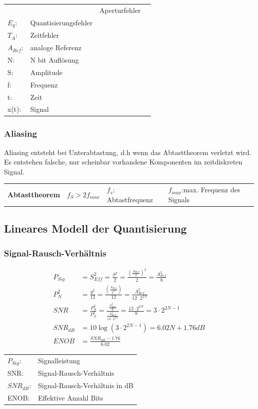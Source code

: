 \begin{longtable}[c]{ l  l l l }
&
\begin{minipage}{5cm}
\begin{tabular}{ll}
$E_{A}$: &Aperturfehler\\
$E_{q}$:&Quantisierungsfehler\\
$T_{A}$:&Zeitfehler\\
$A_{Ref}$:&analoge Referenz\\
N:& N bit Auflösung\\
S: &Amplitude\\
f: &Frequenz\\
t: &Zeit\\
x(t):&Signal
\end{tabular}


\end{minipage}
\\
\end{longtable}


\subsubsection{Aliasing}
Aliasing entsteht bei Unterabtastung, d.h wenn das Abtasttheorem verletzt wird.
Es entstehen falsche, nur scheinbar vorhandene Komponenten im zeitdiskreten
Signal.

\begin{tabular}{llll}
	\textbf{Abtasttheorem}
	& $f_{S}>2f_{max}$
	& $f_{s}$: Abtastfrequenz
	&$f_{max}$:max. Frequenz des Signals
\end{tabular}

\subsection{Lineares Modell der Quantisierung}
\subsubsection{Signal-Rausch-Verhältnis}
\begin{multicols}{2}
\begin{align*}
P_{Sig} &= S^2_{Eff} = \frac{S^2}{2} = \frac{(\frac{A_{Ref}}{2})^2}{2} = \frac{A^2_{Ref}}{8}\\
P^2_{N} &= \frac{q^2}{12} = \frac{(\frac{A_{Ref}}{2^N})}{12} = \frac{A^2_{Ref}}{12\cdot2^{2N}}\\
SNR		&= \frac{P^2_{S}}{P^2_{N}} = \frac{\frac{A^2_{Ref}}{8}}{\frac{A^2_{Ref}}{12\cdot2^{2N}}} = \frac{12\cdot2^{2N}}{8} = 3\cdot2^{2N-1}\\
SNR_{dB}&= 10\log(3\cdot2^{2N-1}) = 6.02N+1.76dB\\
ENOB	&= \frac{SNR_{dB}-1.76}{6.02}
\end{align*}

\begin{tabular}{ll}
$P_{Sig}$:&Signalleistung\\
SNR:&Signal-Rausch-Verhältnis\\
$SNR_{dB}$:&Signal-Rausch-Verhältnis in dB\\
ENOB:&Effektive Anzahl Bits\\
\end{tabular}
\end{multicols}